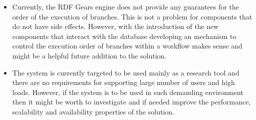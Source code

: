 \begin{itemize}
\item Currently, the RDF Gears engine does not provide any guarantees for the order of the execution of branches. This is not a problem for components that do not have side effects. However, with the introduction of the new components that interact with the database developing an mechanism to control the execution order of branches within a workflow makes sense and might be a helpful future addition to the solution.

\item The system is currently targeted to be used mainly as a research tool and there are no requirements for supporting large number of users and high loads. However, if the system is to be used in such demanding environment then it might be worth to investigate and if needed improve the performance, scalability and availability properties of the solution.


\end{itemize}

